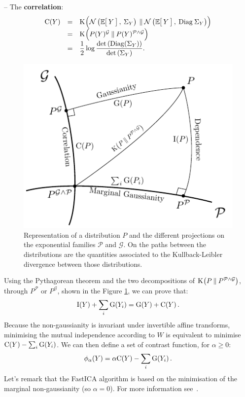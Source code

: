 \documentclass[a4paper]{article}
\newcommand{\Kl}[3][]{\mathrm K_{#1}\!\zp{#2\:\|\:#3}}
\newcommand{\zZ}[2]{\mathrm #1\!\zp{#2}}
\newcommand{\zD}{\mathcal}
\newcommand{\Ng}[2]{\mathcal{N}\zp{#1,\:#2}}
\newcommand{\zmev}[1]{\textbf{#1}}
\begin{document}
-- The \zmev{correlation}:
\begin{equation}\begin{array}{rcl}
  \zZ CY &=& \displaystyle\Kl{\Ng{\zesp Y}{\Sigma_Y}\zpbig2}{\Ng{\zesp Y}{\mathrm{Diag}\:\Sigma_Y}}\\
  &=&\Kl{\zpbig2 P(Y)^{\zD G}}{P(Y)^{\zD P\wedge\zD G}}\\
  &=& \displaystyle\frac 12\log\frac{\det\zp{\mathrm{Diag}(\Sigma_Y)}}{\det\zp{\Sigma_Y}}.
\end{array}\end{equation}

\begin{figure}\centering
\includegraphics{figure_tikz/theory_info.pdf}
\caption{Representation of a distribution $P$ and the different projections on the exponential families $\zD P$ and $\zD G$. On the paths between the distributions are the quantities associated to the Kullback-Leibler divergence between those distributions.}\label{fig:pythagorean}
\end{figure}

Using the Pythagorean theorem and the two decompositions of $\Kl P{P^{\zD P\wedge\zD G}}$, through $P^{\zD P}$ or $P^{\zD G}$, shown in the Figure \ref{fig:pythagorean}, we can prove that:
\begin{equation}
        \zZ IY + \sum_i\zZ G{Y_i} = \zZ GY + \zZ CY.
\end{equation}
Because the non-gaussianity is invariant under invertible affine transforms, minimising the mutual independence according to $W$ is equivalent to minimise $\zZ CY - \sum_i\zZ G{Y_i}$. We can then define a set of contrast function, for $\alpha\geq 0$:
\begin{equation}
  \phi_\alpha(Y) = \alpha \zZ CY - \sum_i\zZ G{Y_i}.
\end{equation}
Let's remark that the FastICA algorithm is based on the minimisation of the marginal non-gaussianity (so $\alpha = 0$). For more information see~\cite{cardoso2003}.
\end{document}
